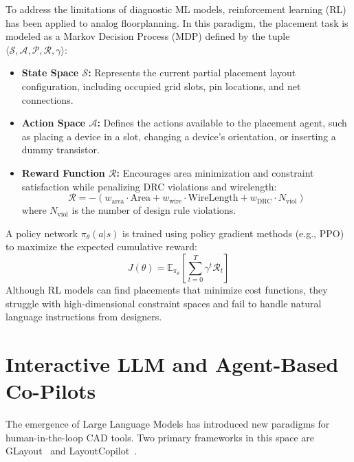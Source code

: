 To address the limitations of diagnostic ML models, reinforcement learning (RL) has been applied to analog floorplanning. In this paradigm, the placement task is modeled as a Markov Decision Process (MDP) defined by the tuple $\langle \mathcal{S}, \mathcal{A}, \mathcal{P}, \mathcal{R}, \gamma \rangle$:
\begin{itemize}
    \item \textbf{State Space $\mathcal{S}$:} Represents the current partial placement layout configuration, including occupied grid slots, pin locations, and net connections.
    \item \textbf{Action Space $\mathcal{A}$:} Defines the actions available to the placement agent, such as placing a device in a slot, changing a device's orientation, or inserting a dummy transistor.
    \item \textbf{Reward Function $\mathcal{R}$:} Encourages area minimization and constraint satisfaction while penalizing DRC violations and wirelength:
    \begin{equation}
        \mathcal{R} = - \left( w_{\text{area}} \cdot \text{Area} + w_{\text{wire}} \cdot \text{WireLength} + w_{\text{DRC}} \cdot N_{\text{viol}} \right)
    \end{equation}
    where $N_{\text{viol}}$ is the number of design rule violations.
\end{itemize}
A policy network $\pi_{\theta}(a|s)$ is trained using policy gradient methods (e.g., PPO) to maximize the expected cumulative reward:
\begin{equation}
    J(\theta) = \mathbb{E}_{\pi_{\theta}}\left[ \sum_{t=0}^{T} \gamma^t \mathcal{R}_t \right]
\end{equation}
Although RL models can find placements that minimize cost functions, they struggle with high-dimensional constraint spaces and fail to handle natural language instructions from designers.

\section[Interactive LLM Co-Pilots]{Interactive LLM and Agent-Based Co-Pilots}
\label{sec:lit_llms}

The emergence of Large Language Models has introduced new paradigms for human-in-the-loop CAD tools. Two primary frameworks in this space are GLayout~\cite{glayout} and LayoutCopilot~\cite{layoutcopilot}.

